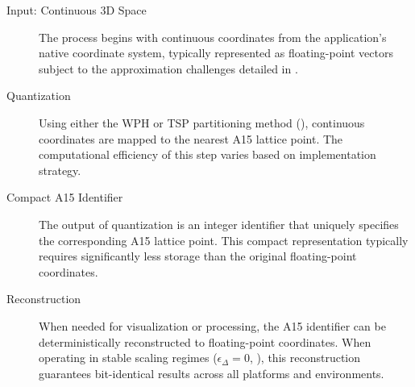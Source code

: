 \documentclass[10pt]{article}
\begin{document}
\begin{description}
    \item[Input: Continuous 3D Space] The process begins with continuous coordinates from the application's native coordinate system, typically represented as floating-point vectors subject to the approximation challenges detailed in .

    \item[Quantization] Using either the WPH or TSP partitioning method (), continuous coordinates are mapped to the nearest A15 lattice point. The computational efficiency of this step varies based on implementation strategy.

    \item[Compact A15 Identifier] The output of quantization is an integer identifier that uniquely specifies the corresponding A15 lattice point. This compact representation typically requires significantly less storage than the original floating-point coordinates.

    \item[Reconstruction] When needed for visualization or processing, the A15 identifier can be deterministically reconstructed to floating-point coordinates. When operating in stable scaling regimes ($\epsilon_\Delta = 0$, ), this reconstruction guarantees bit-identical results across all platforms and environments.
\end{description}
\end{document}
